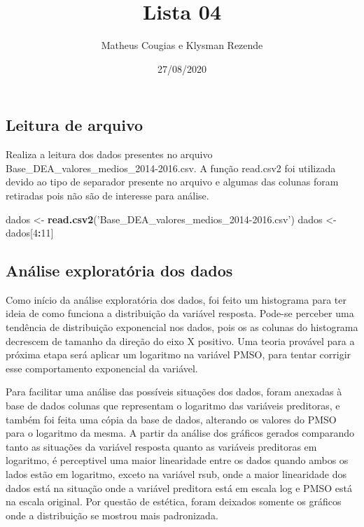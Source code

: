 \documentclass[
]{article}
\title{Lista 04}
\author{Matheus Cougias e Klysman Rezende}
\date{27/08/2020}
\newenvironment{Shaded}{\begin{snugshade}}{\end{snugshade}}
\newcommand{\DecValTok}[1]{\textcolor[rgb]{0.00,0.00,0.81}{#1}}
\newcommand{\KeywordTok}[1]{\textcolor[rgb]{0.13,0.29,0.53}{\textbf{#1}}}
\newcommand{\NormalTok}[1]{#1}
\newcommand{\OperatorTok}[1]{\textcolor[rgb]{0.81,0.36,0.00}{\textbf{#1}}}
\newcommand{\StringTok}[1]{\textcolor[rgb]{0.31,0.60,0.02}{#1}}
\begin{document}
\maketitle

\hypertarget{leitura-de-arquivo}{%
\subsection{Leitura de arquivo}\label{leitura-de-arquivo}}

Realiza a leitura dos dados presentes no arquivo
Base\_DEA\_valores\_medios\_2014-2016.csv. A função read.csv2 foi
utilizada devido ao tipo de separador presente no arquivo e algumas das
colunas foram retiradas pois não são de interesse para análise.

\begin{Shaded}
\begin{Highlighting}[]
\NormalTok{  dados <-}\StringTok{ }\KeywordTok{read.csv2}\NormalTok{(}\StringTok{'Base_DEA_valores_medios_2014-2016.csv'}\NormalTok{)}
\NormalTok{  dados <-}\StringTok{ }\NormalTok{dados[}\DecValTok{4}\OperatorTok{:}\DecValTok{11}\NormalTok{]}
\end{Highlighting}
\end{Shaded}

\hypertarget{anuxe1lise-exploratuxf3ria-dos-dados}{%
\subsection{Análise exploratória dos
dados}\label{anuxe1lise-exploratuxf3ria-dos-dados}}

Como início da análise exploratória dos dados, foi feito um histograma
para ter ideia de como funciona a distribuição da variável resposta.
Pode-se perceber uma tendência de distribuição exponencial nos dados,
pois os as colunas do histograma decrescem de tamanho da direção do eixo
X positivo. Uma teoria provável para a próxima etapa será aplicar um
logaritmo na variável PMSO, para tentar corrigir esse comportamento
exponencial da variável.

Para facilitar uma análise das possíveis situações dos dados, foram
anexadas à base de dados colunas que representam o logaritmo das
variáveis preditoras, e também foi feita uma cópia da base de dados,
alterando os valores do PMSO para o logaritmo da mesma. A partir da
análise dos gráficos gerados comparando tanto as situações da variável
resposta quanto as variáveis preditoras em logaritmo, é perceptivel uma
maior linearidade entre os dados quando ambos os lados estão em
logaritmo, exceto na variável rsub, onde a maior linearidade dos dados
está na situação onde a variável preditora está em escala log e PMSO
está na escala original. Por questão de estética, foram deixados somente
os gráficos onde a distribuição se mostrou mais padronizada.
\end{document}
